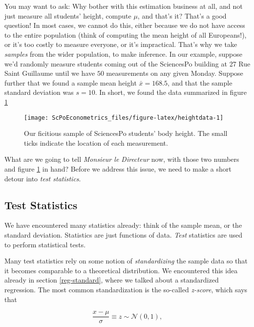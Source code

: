 \documentclass[]{book}
\begin{document}
You may want to ask: Why bother with this estimation business at all,
and not just measure all students' height, compute \(\mu\), and that's
it? That's a good question! In most cases, we cannot do this, either
because we do not have access to the entire population (think of
computing the mean height of all Europeans!), or it's too costly to
measure everyone, or it's impractical. That's why we take \emph{samples}
from the wider population, to make inference. In our example, suppose
we'd randomly measure students coming out of the SciencesPo building at
27 Rue Saint Guillaume until we have \(50\) measurements on any given
Monday. Suppose further that we found a sample mean height
\(\bar{x} = 168.5\), and that the sample standard deviation was
\(s=10\). In short, we found the data summarized in figure
\ref{fig:heightdata}

\begin{figure}

{\centering \texttt{[image: ScPoEconometrics\_files/figure-latex/heightdata-1]} 

}

\caption{Our ficitious sample of SciencesPo students' body height. The small ticks indicate the location of each measurement.}\label{fig:heightdata}
\end{figure}

What are we going to tell \emph{Monsieur le Directeur} now, with those
two numbers and figure \ref{fig:heightdata} in hand? Before we address
this issue, we need to make a short detour into \emph{test statistics}.

\subsection{Test Statistics}\label{test-statistics}

We have encountered many statistics already: think of the sample mean,
or the standard deviation. Statistics are just functions of data.
\emph{Test} statistics are used to perform statistical tests.

Many test statistics rely on some notion of \emph{standardizing} the
sample data so that it becomes comparable to a theoretical distribution.
We encountered this idea already in section \ref{reg-standard}, where we
talked about a standardized regression. The most common standardization
is the so-called \emph{z-score}, which says that

\begin{equation}
\frac{x - \mu}{\sigma}\equiv z\sim \mathcal{N}(0,1), \label{eq:zscore}
\end{equation}
\end{document}
